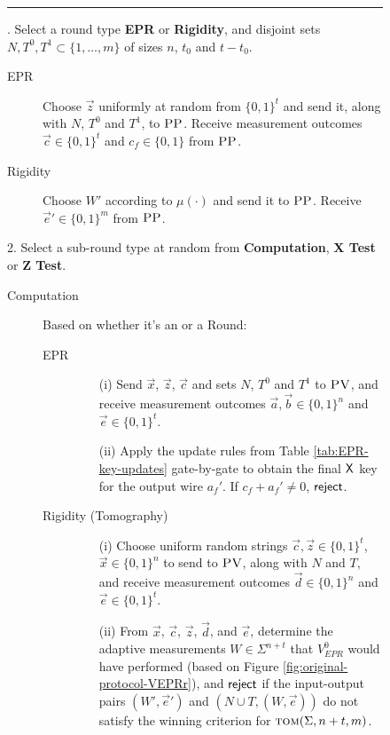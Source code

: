 \begin{figure}[H]
\rule[1ex]{\textwidth}{0.5pt}
\vspace{-20pt}
. Select a round type \textbf{EPR} or \textbf{Rigidity}, and disjoint sets $N,T^0,T^1\subset \{1,\ldots,m\}$ of sizes $n$, $t_0$ and $t-t_0$.  
\begin{description}
\item[EPR] Choose $\vec{z}$ uniformly at random from $\{0,1\}^t$ and send it, along with $N$, $T^0$ and $T^1$, to $\textsc{PP}$. Receive measurement outcomes $\vec{c}\in\{0,1\}^t$ and $c_f\in\{0,1\}$ from $\textsc{PP}$.
\item[Rigidity] Choose $W'$ according to $\mu(\cdot)$ and send it to $\textsc{PP}$. Receive $\vec{e}'\in \{0,1\}^m$ from $\textsc{PP}$. 
\end{description}
2. Select a sub-round type at random from \textbf{Computation}, \textbf{X Test} or \textbf{Z Test}. 
\begin{description}
\item[Computation] Based on whether it's an  or a  Round:
	\begin{description}
	\item[EPR]
		\begin{enumerate}
		\item[(i)] Send $\vec{x}$, $\vec{z}$, $\vec{c}$ and sets $N$, $T^0$ and $T^1$ to $\textsc{PV}$, and receive measurement outcomes $\vec{a},\vec{b}\in \{0,1\}^n$ and $\vec{e}\in\{0,1\}^t$.
		\item[(ii)] Apply the update rules from Table \ref{tab:EPR-key-updates} gate-by-gate to obtain the final $\sf X$ key for the output wire $a_f'$. If $c_f+a_f'\neq 0$, $\sf reject$. 
		\end{enumerate}
	\item[Rigidity (Tomography)]
		\begin{enumerate}
		\item[(i)] Choose uniform random strings $\vec{c},\vec{z}\in\{0,1\}^t$, $\vec{x} \in \{0,1\}^n$ 
		to send to $\textsc{PV}$, along with $N$ and $T$, and receive measurement outcomes $\vec{d}\in \{0,1\}^n$ and $\vec{e}\in\{0,1\}^t$. 
		\item[(ii)]
		From $\vec{x}$, $\vec{c}$, $\vec{z}$, $\vec{d}$, and $\vec{e}$, determine the adaptive measurements $W\in\Sigma^{n+t}$ that $V_{EPR}^0$ would have performed (based on Figure \ref{fig:original-protocol-VEPRr}), and $\sf reject$ if the input-output pairs $(W',\vec{e}')$ and $(N\cup T,(W,\vec{e}))$ do not satisfy the winning criterion for $\textsc{tom}(\Sigma,n+t,m)$.

\end{enumerate}
\end{description}
\end{description}
\end{figure}
